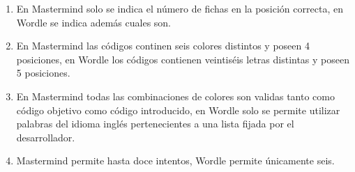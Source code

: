 \begin{enumerate}
  \item En Mastermind solo se indica el número de fichas en la posición correcta, en Wordle se indica además cuales son.
  \item En Mastermind las códigos continen seis colores distintos y poseen 4 posiciones, en Wordle los códigos contienen veintiséis letras distintas y poseen 5 posiciones.
  \item En Mastermind todas las combinaciones de colores son validas tanto como código objetivo como código introducido, en Wordle solo se permite utilizar palabras
  del idioma inglés pertenecientes a una lista fijada por el desarrollador.
  \item Mastermind permite hasta doce intentos, Wordle permite únicamente seis.
\end{enumerate}